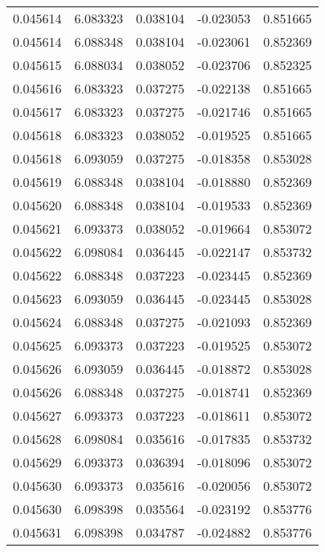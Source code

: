 \begin{tabular}{lrrrr}
0.045614    &  6.083323 &  0.038104 & -0.023053 &             0.851665 \\
0.045614    &  6.088348 &  0.038104 & -0.023061 &             0.852369 \\
0.045615    &  6.088034 &  0.038052 & -0.023706 &             0.852325 \\
0.045616    &  6.083323 &  0.037275 & -0.022138 &             0.851665 \\
0.045617    &  6.083323 &  0.037275 & -0.021746 &             0.851665 \\
0.045618    &  6.083323 &  0.038052 & -0.019525 &             0.851665 \\
0.045618    &  6.093059 &  0.037275 & -0.018358 &             0.853028 \\
0.045619    &  6.088348 &  0.038104 & -0.018880 &             0.852369 \\
0.045620    &  6.088348 &  0.038104 & -0.019533 &             0.852369 \\
0.045621    &  6.093373 &  0.038052 & -0.019664 &             0.853072 \\
0.045622    &  6.098084 &  0.036445 & -0.022147 &             0.853732 \\
0.045622    &  6.088348 &  0.037223 & -0.023445 &             0.852369 \\
0.045623    &  6.093059 &  0.036445 & -0.023445 &             0.853028 \\
0.045624    &  6.088348 &  0.037275 & -0.021093 &             0.852369 \\
0.045625    &  6.093373 &  0.037223 & -0.019525 &             0.853072 \\
0.045626    &  6.093059 &  0.036445 & -0.018872 &             0.853028 \\
0.045626    &  6.088348 &  0.037275 & -0.018741 &             0.852369 \\
0.045627    &  6.093373 &  0.037223 & -0.018611 &             0.853072 \\
0.045628    &  6.098084 &  0.035616 & -0.017835 &             0.853732 \\
0.045629    &  6.093373 &  0.036394 & -0.018096 &             0.853072 \\
0.045630    &  6.093373 &  0.035616 & -0.020056 &             0.853072 \\
0.045630    &  6.098398 &  0.035564 & -0.023192 &             0.853776 \\
0.045631    &  6.098398 &  0.034787 & -0.024882 &             0.853776 \\

\end{tabular}
